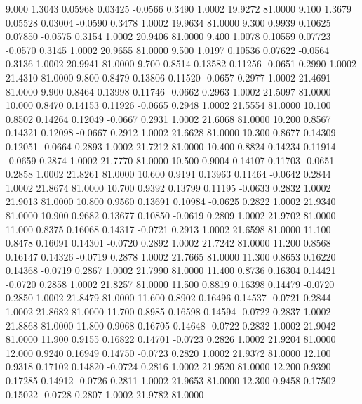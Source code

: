    9.000   1.3043   0.05968   0.03425  -0.0566   0.3490   1.0002  19.9272  81.0000
   9.100   1.3679   0.05528   0.03004  -0.0590   0.3478   1.0002  19.9634  81.0000
   9.300   0.9939   0.10625   0.07850  -0.0575   0.3154   1.0002  20.9406  81.0000
   9.400   1.0078   0.10559   0.07723  -0.0570   0.3145   1.0002  20.9655  81.0000
   9.500   1.0197   0.10536   0.07622  -0.0564   0.3136   1.0002  20.9941  81.0000
   9.700   0.8514   0.13582   0.11256  -0.0651   0.2990   1.0002  21.4310  81.0000
   9.800   0.8479   0.13806   0.11520  -0.0657   0.2977   1.0002  21.4691  81.0000
   9.900   0.8464   0.13998   0.11746  -0.0662   0.2963   1.0002  21.5097  81.0000
  10.000   0.8470   0.14153   0.11926  -0.0665   0.2948   1.0002  21.5554  81.0000
  10.100   0.8502   0.14264   0.12049  -0.0667   0.2931   1.0002  21.6068  81.0000
  10.200   0.8567   0.14321   0.12098  -0.0667   0.2912   1.0002  21.6628  81.0000
  10.300   0.8677   0.14309   0.12051  -0.0664   0.2893   1.0002  21.7212  81.0000
  10.400   0.8824   0.14234   0.11914  -0.0659   0.2874   1.0002  21.7770  81.0000
  10.500   0.9004   0.14107   0.11703  -0.0651   0.2858   1.0002  21.8261  81.0000
  10.600   0.9191   0.13963   0.11464  -0.0642   0.2844   1.0002  21.8674  81.0000
  10.700   0.9392   0.13799   0.11195  -0.0633   0.2832   1.0002  21.9013  81.0000
  10.800   0.9560   0.13691   0.10984  -0.0625   0.2822   1.0002  21.9340  81.0000
  10.900   0.9682   0.13677   0.10850  -0.0619   0.2809   1.0002  21.9702  81.0000
  11.000   0.8375   0.16068   0.14317  -0.0721   0.2913   1.0002  21.6598  81.0000
  11.100   0.8478   0.16091   0.14301  -0.0720   0.2892   1.0002  21.7242  81.0000
  11.200   0.8568   0.16147   0.14326  -0.0719   0.2878   1.0002  21.7665  81.0000
  11.300   0.8653   0.16220   0.14368  -0.0719   0.2867   1.0002  21.7990  81.0000
  11.400   0.8736   0.16304   0.14421  -0.0720   0.2858   1.0002  21.8257  81.0000
  11.500   0.8819   0.16398   0.14479  -0.0720   0.2850   1.0002  21.8479  81.0000
  11.600   0.8902   0.16496   0.14537  -0.0721   0.2844   1.0002  21.8682  81.0000
  11.700   0.8985   0.16598   0.14594  -0.0722   0.2837   1.0002  21.8868  81.0000
  11.800   0.9068   0.16705   0.14648  -0.0722   0.2832   1.0002  21.9042  81.0000
  11.900   0.9155   0.16822   0.14701  -0.0723   0.2826   1.0002  21.9204  81.0000
  12.000   0.9240   0.16949   0.14750  -0.0723   0.2820   1.0002  21.9372  81.0000
  12.100   0.9318   0.17102   0.14820  -0.0724   0.2816   1.0002  21.9520  81.0000
  12.200   0.9390   0.17285   0.14912  -0.0726   0.2811   1.0002  21.9653  81.0000
  12.300   0.9458   0.17502   0.15022  -0.0728   0.2807   1.0002  21.9782  81.0000
